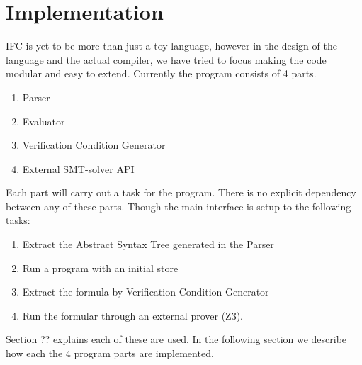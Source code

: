 \section{Implementation}
IFC is yet to be more than just a toy-language, however in the design of the language and the actual compiler, we have tried to focus making the code modular and easy to extend.
Currently the program consists of 4 parts.
\begin{enumerate}
  \item Parser
  \item Evaluator
  \item Verification Condition Generator
  \item External SMT-solver API
\end{enumerate}
Each part will carry out a task for the program. There is no explicit dependency between any of these parts. Though the main interface is setup to the following tasks:
\begin{enumerate}
  \item Extract the Abstract Syntax Tree generated in the Parser
  \item Run a program with an initial store
  \item Extract the formula by Verification Condition Generator
  \item Run the formular through an external prover (Z3).
\end{enumerate}
Section ?? explains each of these are used. In the following section we describe how each the 4 program parts are implemented.








